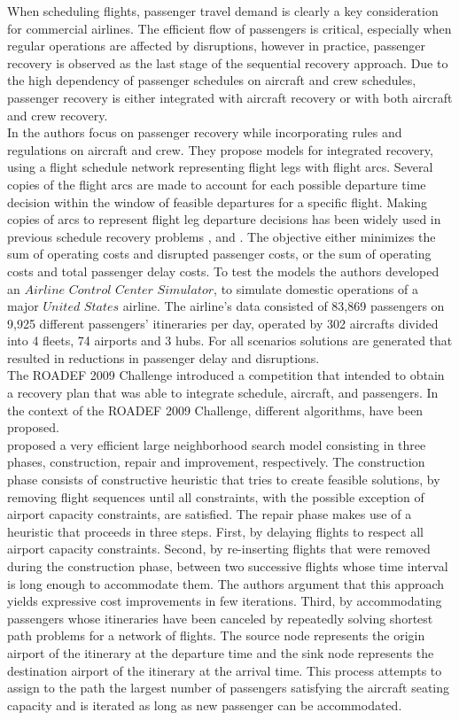 \documentclass[ijoo,nonblindrev]{informs-ijoo}
\begin{document}
When scheduling flights, passenger travel demand is clearly a key consideration for commercial airlines. The efficient flow of passengers is critical, especially when regular operations are affected by disruptions, however in practice, passenger recovery is observed as the last stage of the sequential recovery approach. Due to the high dependency of passenger schedules on aircraft and crew schedules, passenger recovery is either integrated with aircraft recovery or with both aircraft and crew recovery.\\
In \citep{Bratu2006} the authors focus on passenger recovery while incorporating rules and regulations on aircraft and crew. They propose models for integrated recovery, using a flight schedule network representing flight legs with flight arcs. Several copies of the flight arcs are made to account for each possible departure time decision within the window of feasible departures for a specific flight. Making copies of arcs to represent flight leg departure decisions has been widely used in previous schedule recovery problems \citep{Yan1997}, \citep{THENGVALL2000} and \citep{Thengvall2001}. The objective either minimizes the sum of operating costs and disrupted passenger costs, or the sum of operating costs and total passenger delay costs. To test the models the authors developed an $Airline$ $Control$ $Center$ $Simulator$, to simulate domestic operations of a major $United$ $States$ airline. The airline's data consisted of 83,869 passengers on 9,925 different passengers' itineraries per day, operated by 302 aircrafts divided into 4 fleets, 74 airports and 3 hubs. For all scenarios solutions are generated that resulted in reductions in passenger delay and disruptions.\\
The ROADEF 2009 Challenge introduced a competition that intended to obtain a recovery plan that was able to integrate schedule, aircraft, and passengers. In the context of the ROADEF 2009 Challenge, different algorithms, have been proposed.\\
\citep{bisaillon2011} proposed a very efficient large neighborhood search model consisting in three phases, construction, repair and improvement, respectively. The construction phase consists of constructive heuristic that tries to create feasible solutions, by removing flight sequences until all constraints, with the possible exception of airport capacity constraints, are satisfied.  The repair phase makes use of a heuristic that proceeds in three steps. First, by delaying flights to respect all airport capacity constraints. Second, by re-inserting flights that were removed during the construction phase, between two successive flights whose time interval is long enough to accommodate them. The authors argument that this approach yields expressive cost improvements in few iterations. Third, by accommodating passengers whose itineraries have been canceled by repeatedly solving shortest path problems for a network of flights. The source node represents the origin airport of the itinerary at the departure time and the sink node represents the destination airport of the itinerary at the arrival time. This process attempts to assign to the path the largest number of passengers satisfying the aircraft seating capacity and is iterated as long as new passenger can be accommodated.
\end{document}

